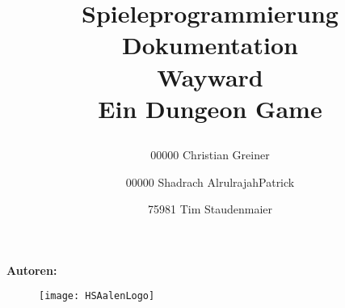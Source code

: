 


\title{\begin{center}\fontsize{40bp}{40bp}\selectfont\color{DarkBlue}
Spieleprogrammierung Dokumentation \\ [20pt]
\color{black}
\fontsize{16bp}{16bp}\selectfont
\fontsize{30bp}{30bp}\selectfont
\color{LightBlue}
Wayward\\
\fontsize{10bp}{10bp}\selectfont
\color{black}
\bigskip
Ein Dungeon Game
\end{center}
}
\maketitle

\date{}
\begin{center}
\textbf{\fontsize{12bp}{12bp}\selectfont
Autoren:\\}
\bigskip
\author{ 00000 Christian Greiner\\
\and 00000 Shadrach AlrulrajahPatrick\\
\and 75981 Tim Staudenmaier
}
\end{center}
\begin{figure}
\centering
\texttt{[image: HSAalenLogo]}
\end{figure}

\newpage
			

\setcounter{page}{1} %

{\hypersetup{linkcolor=black}
\tableofcontents
}
\newpage